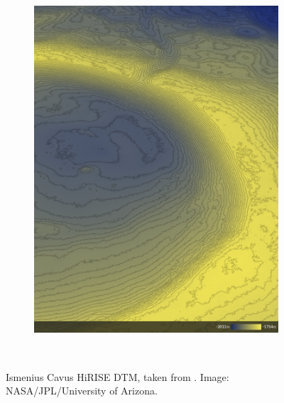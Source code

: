 \begin{figure}[h]
\begin{subfigure}[t]{\subfigureWidth}
        \label{fig:sub:ismenius-cavus-dtm}
    \end{subfigure}\hfill
    \begin{subfigure}[t]{\subfigureWidth}
        \centering
        \includegraphics[height=\graphicsHeight]{sections/mars-solar-energy/mission-sites/images/ismenius-cavus-dtm-altimetry.png}
		\label{fig:sub:ismenius-cavus-dtm-altimetry}
	\end{subfigure}\\[0.8ex]
    \caption[Ismenius Cavus \ac{HiRISE} \ac{DTM}]
            {Ismenius Cavus \ac{HiRISE} \ac{DTM}, taken from . Image: \ac{NASA}/\ac{JPL}/University of Arizona.}
    \label{fig:ismenius-cavus}
\vspace{-2ex}
\end{figure}

\clearpage
